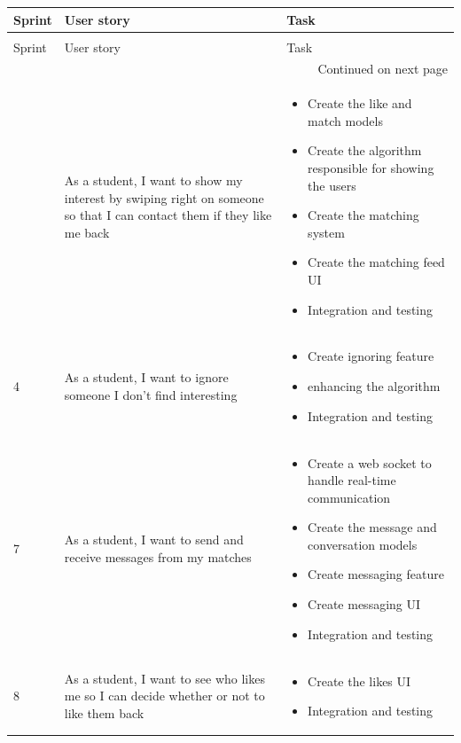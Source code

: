 \begin{longtable}{|l|p{6cm}|p{8cm}|}
\hline
Sprint & User story & Task\\
\hline
\endfirsthead

\multicolumn{3}{c}{{\bfseries}} \\
\hline
Sprint & User story & Task\\
\hline
\endhead

\hline \multicolumn{3}{|r|}{{Continued on next page}} \\ \hline
\endfoot

\hline
\endlastfoot
3 & As a student, I want to show my interest by swiping right on someone
so that I can contact them if they like me back & \begin{itemize}
    \item Create the like and match models
    \item Create the algorithm responsible for showing the users
    \item Create the matching system
    \item Create the matching feed UI
    \item Integration and testing
\end{itemize} \\ \hline

4 & As a student, I want to ignore someone I don’t find interesting & \begin{itemize}
    \item Create ignoring feature
    \item enhancing the algorithm
    \item Integration and testing
\end{itemize} \\ \hline

7 & As a student, I want to send and receive messages from my matches & \begin{itemize}
    \item Create a web socket to handle real-time communication
    \item Create the message and conversation models
    \item Create messaging feature
    \item Create messaging UI
    \item Integration and testing
\end{itemize} \\ \hline

8 & As a student, I want to see who likes me so I can decide whether or
not to like them back & \begin{itemize}
    \item Create the likes UI
    \item Integration and testing
\end{itemize} \\ \hline


\end{longtable}
